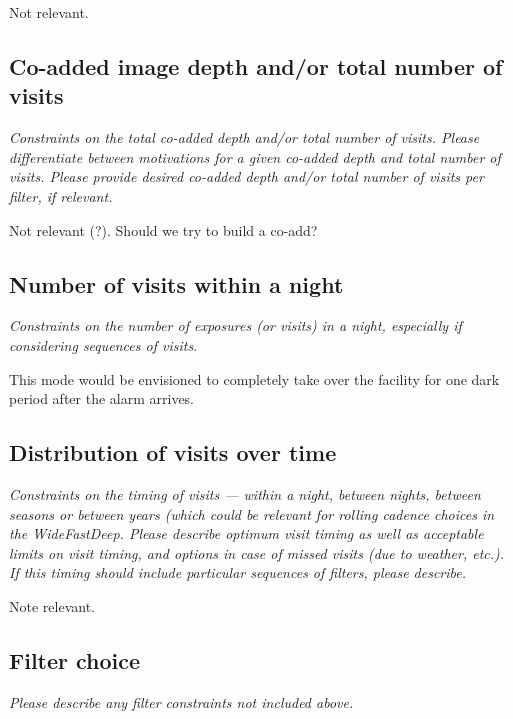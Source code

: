 \documentclass[11pt]{article}
\begin{document}
Not relevant.

\subsection{Co-added image depth and/or total number of visits}
\begin{footnotesize}{\it  Constraints on the total co-added depth and/or total number of visits.
Please differentiate between motivations for a given co-added depth and total number of visits. 
Please provide desired co-added depth and/or total number of visits per filter, if relevant.}
\end{footnotesize}

Not relevant (?).  Should we try to build a co-add?

\subsection{Number of visits within a night}
\begin{footnotesize}{\it Constraints on the number of exposures (or visits) in a night, especially if considering sequences of visits.  }
\end{footnotesize}

This mode would be envisioned to completely take over the facility for
one dark period after the alarm arrives.

\subsection{Distribution of visits over time}
\begin{footnotesize}{\it Constraints on the timing of visits --- within a night, between nights, between seasons or
between years (which could be relevant for rolling cadence choices in the WideFastDeep. 
Please describe optimum visit timing as well as acceptable limits on visit timing, and options in
case of missed visits (due to weather, etc.). If this timing should include particular sequences
of filters, please describe.}
\end{footnotesize}

Note relevant.

\subsection{Filter choice}
\begin{footnotesize}
{\it Please describe any filter constraints not included above.}
\end{footnotesize}
\end{document}
